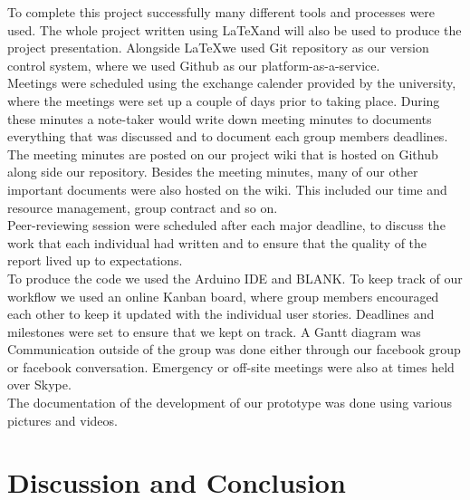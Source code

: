 To complete this project successfully many different tools and processes were used. The whole project written using \LaTeX and will also be used to produce the project presentation. Alongside \LaTeX we used Git repository as our version control system, where we used Github as our platform-as-a-service.\\
Meetings were scheduled using the exchange calender provided by the university, where the meetings were set up a couple of days prior to taking place. During these minutes a note-taker would write down meeting minutes to documents everything that was discussed and to document each group members deadlines. The meeting minutes are posted on our project wiki that is hosted on Github along side our repository. Besides the meeting minutes, many of our other important documents were also hosted on the wiki. This included our time and resource management, group contract and so on.\\
Peer-reviewing session were scheduled after each major deadline, to discuss the work that each individual had written and to ensure that the quality of the report lived up to expectations.\\
To produce the code we used the Arduino IDE and BLANK.%
To keep track of our workflow we used an online Kanban board, where group members encouraged each other to keep it updated with the individual user stories. Deadlines and milestones were set to ensure that we kept on track. A Gantt diagram was \\
Communication outside of the group was done either through our facebook group or facebook conversation. Emergency or off-site meetings were also at times held over Skype.\\
The documentation of the development of our prototype was done using various pictures and videos.
\section{Discussion and Conclusion}
